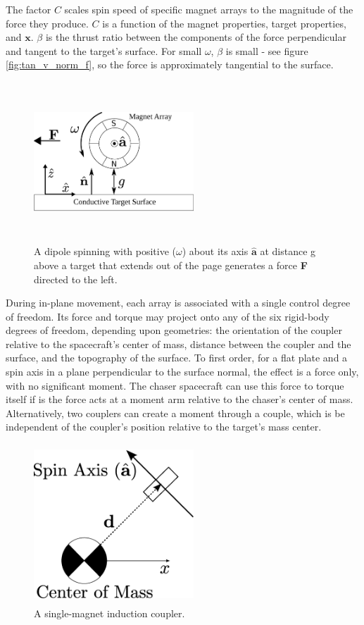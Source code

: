 The factor $C$ scales spin speed of specific magnet arrays to the magnitude of the force they produce. $C$ is a function of the magnet properties, target properties, and $\boldsymbol{x}$. $\beta$ is the thrust ratio between the components of the force perpendicular and tangent to the target's surface. For small $\omega$, $\beta$ is small - see figure \ref{fig:tan_v_norm_f}, so the force is approximately tangential to the surface.

\begin{figure}
\includegraphics[width = 6cm, height = 6cm ]{figures/spin_mag_diagram.eps}

\caption{A dipole spinning with positive ($\omega$) about its axis $\hat{\textbf{a}}$ at distance g above a target that extends out of the page generates a force \textbf{F} directed to the left.}
\label{fig:arry_force_diagram}
\end{figure}

During in-plane movement, each array is associated with a single control degree of freedom. Its force and torque may project onto any of the six rigid-body degrees of freedom, depending upon geometries: the orientation of the coupler relative to the spacecraft's center of mass, distance between the coupler and the surface, and the topography of the surface. To first order, for a flat plate and a spin axis in a plane perpendicular to the surface normal, the effect is a force only, with no significant moment. The chaser spacecraft can use this force to torque itself if is the force acts at a moment arm relative to the chaser's center of mass. Alternatively, two couplers can create a moment through a couple, which is be independent of the coupler's position relative to the target's mass center.

\begin{figure}
\includegraphics[width = 6cm, height = 6cm ]{figures/simple_geometry.eps}

\caption{A single-magnet induction coupler.}
\label{fig:min_array_diagram}
\end{figure}

